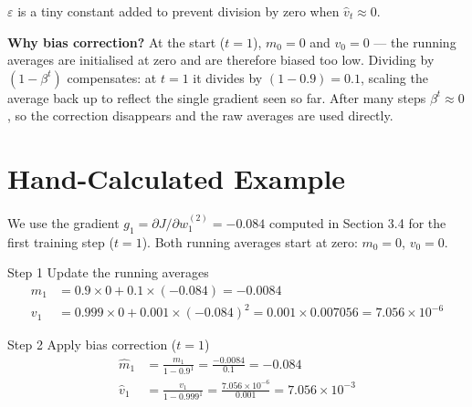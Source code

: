 \documentclass[12pt, a4paper]{article}
\newif\ifstudentmode
\newcommand{\sol}[2][6cm]{%
  \ifstudentmode
    \underline{\hspace{#1}}%
  \else
    {#2}%
  \fi
}
\theoremstyle{definition}
\begin{document}
\vspace{0.5em}

$\varepsilon$ is a tiny constant added to prevent division by zero when
$\hat{v}_t \approx 0$.

\begin{notebox}
\textbf{Why bias correction?}
At the start ($t = 1$), $m_0 = 0$ and $v_0 = 0$ --- the running averages
are initialised at zero and are therefore biased too low.
Dividing by $(1 - \beta^t)$ compensates: at $t=1$ it divides by $(1-0.9) = 0.1$,
scaling the average back up to reflect the single gradient seen so far.
After many steps $\beta^t \approx 0$, so the correction disappears and the
raw averages are used directly.
\end{notebox}

\section{Hand-Calculated Example}

We use the gradient $g_1 = \partial J / \partial w^{(2)}_1 = -0.084$
computed in Section 3.4 for the first training step ($t = 1$).
Both running averages start at zero: $m_0 = 0$, $v_0 = 0$.

\begin{stepbox}{Step 1 \quad Update the running averages}
\begin{align*}
  m_1 &= 0.9 \times 0 + 0.1 \times (-0.084)
       = \sol[4cm]{-0.0084} \\[6pt]
  v_1 &= 0.999 \times 0 + 0.001 \times (-0.084)^2
       = 0.001 \times 0.007056
       = \sol[4cm]{7.056 \times 10^{-6}}
\end{align*}
\end{stepbox}

\vspace{0.8em}

\begin{stepbox}{Step 2 \quad Apply bias correction ($t = 1$)}
\begin{align*}
  \hat{m}_1 &= \frac{m_1}{1 - 0.9^1}
             = \frac{-0.0084}{0.1}
             = \sol[4cm]{-0.084} \\[6pt]
  \hat{v}_1 &= \frac{v_1}{1 - 0.999^1}
             = \frac{7.056 \times 10^{-6}}{0.001}
             = \sol[4cm]{7.056 \times 10^{-3}}
\end{align*}
\end{stepbox}
\end{document}
